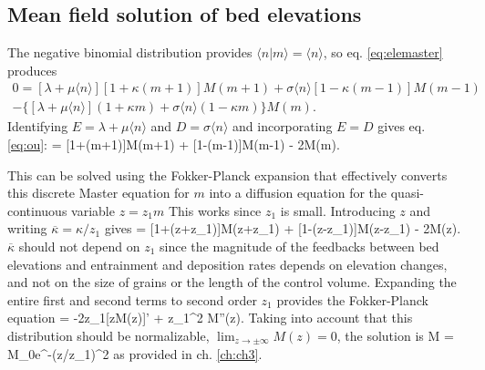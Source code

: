 \subsection{Mean field solution of bed elevations}

The negative binomial distribution provides $\langle n |m \rangle = \langle n \rangle$, so eq. \ref{eq:elemaster} produces
\begin{multline} 0 = [\lambda + \mu \langle n \rangle][1+\kappa(m+1)]M(m+1) + \sigma \langle n \rangle [1-\kappa(m-1)]M(m-1) \\- \{[\lambda + \mu \langle n \rangle](1+\kappa m) + \sigma \langle n \rangle (1-\kappa m) \}M(m). \end{multline}
Identifying $E=\lambda + \mu \langle n \rangle$ and $D = \sigma \langle n \rangle$ and incorporating $E=D$ gives eq. \ref{eq:ou}:
 = [1+\kappa(m+1)]M(m+1) + [1-\kappa(m-1)]M(m-1) - 2M(m).\ee

This can be solved using the Fokker-Planck expansion \citep{Gardiner1983} that effectively converts this discrete Master equation for $m$ into a diffusion equation for the quasi-continuous variable $z=z_1 m$ This works since $z_1$ is small. Introducing $z$ and writing $\overline{\kappa}=\kappa/z_1$ gives
 = [1+\overline{\kappa}(z+z_1)]M(z+z_1) + [1-\overline{\kappa}(z-z_1)]M(z-z_1) - 2M(z).\ee
$\overline{\kappa}$ should not depend on $z_1$ since the magnitude of the feedbacks between bed elevations and entrainment and deposition rates depends on elevation changes, and not on the size of grains or the length of the control volume.
Expanding the entire first and second terms to second order $z_1$ provides the Fokker-Planck equation
 = -2\overline{\kappa}z_1[zM(z)]' + z_1^2 M''(z). \ee
Taking into account that this distribution should be normalizable, $\lim_{z\rightarrow \pm \infty}M(z) = 0$, the solution is
\be M = M_0e^{-\kappa (z/z_1)^2}\ee
as provided in ch. \ref{ch:ch3}.

